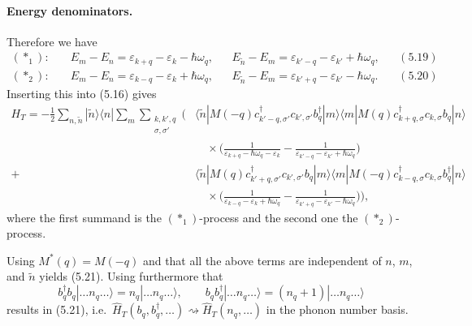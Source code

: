 \documentclass[../../main.tex]{subfiles}
\begin{document}
\paragraph{Energy denominators.}
Therefore we have
\begin{align}
(\ast_1):&\quad E_m-E_n=\varepsilon_{k+q}-\varepsilon_k-\hbar\omega_q,
  &&E_{\tilde n}-E_m=\varepsilon_{k'-q}-\varepsilon_{k'}+\hbar\omega_q,
  &&(5.19)\\
(\ast_2):&\quad E_m-E_n=\varepsilon_{k-q}-\varepsilon_k+\hbar\omega_q,
  &&E_{\tilde n}-E_m=\varepsilon_{k'+q}-\varepsilon_{k'}-\hbar\omega_q.
  &&(5.20)
\end{align}
Inserting this into (5.16) gives
\begin{equation}
\begin{split}
H_T=-\frac{1}{2}\sum_{n,\tilde n}|\tilde n\rangle\langle n|\sum_m
\sum_{\substack{k,k',q\\ \sigma,\sigma'}}\Big(&
\langle\tilde n|M(-q)c^\dagger_{k'-q,\sigma'}c_{k',\sigma'}b^\dagger_q|m\rangle
\langle m|M(q)c^\dagger_{k+q,\sigma}c_{k,\sigma}b_q|n\rangle\\
&\quad\times\Big(\frac{1}{\varepsilon_{k+q}-\hbar\omega_q-\varepsilon_k}
-\frac{1}{\varepsilon_{k'-q}-\varepsilon_{k'}+\hbar\omega_q}\Big)\\
+\;&\langle\tilde n|M(q)c^\dagger_{k'+q,\sigma'}c_{k',\sigma'}b_q|m\rangle
\langle m|M(-q)c^\dagger_{k-q,\sigma}c_{k,\sigma}b^\dagger_q|n\rangle\\
&\quad\times\Big(\frac{1}{\varepsilon_{k-q}-\varepsilon_k+\hbar\omega_q}
-\frac{1}{\varepsilon_{k'+q}-\varepsilon_{k'}-\hbar\omega_q}\Big)\Big),
\end{split}
\end{equation}
where the first summand is the $(\ast_1)$-process and the second one the
$(\ast_2)$-process.

Using $M^*(q)=M(-q)$ and that all the above terms are independent of $n$, $m$, and
$\tilde n$ yields (5.21). Using furthermore that
\begin{equation}
b^\dagger_q b_q|\dots n_q\dots\rangle=n_q|\dots n_q\dots\rangle,\qquad
b_q b^\dagger_q|\dots n_q\dots\rangle=(n_q+1)|\dots n_q\dots\rangle
\end{equation}
results in (5.21), i.e.\ $\hat H_T(b_q,b^\dagger_q,\dots)\rightsquigarrow
\hat H_T(n_q,\dots)$ in the phonon number basis.
\end{document}
